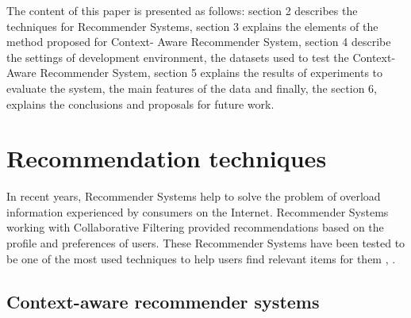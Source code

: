 The content of this paper is presented as
follows: section 2 describes the techniques for Recommender Systems, section 3
explains the elements of the method proposed for Context- Aware Recommender
System, section 4 describe the settings of development environment, the datasets
used to test the Context-Aware Recommender System, section 5 explains the
results of experiments to evaluate the system, the main features of the data and
finally, the section 6, explains the conclusions and proposals for future work.




\section{ Recommendation techniques } \label{sec:2} 

In recent years, Recommender Systems help to solve the problem of overload
information experienced by consumers on the Internet. Recommender Systems
working with Collaborative Filtering provided recommendations based on the
profile and preferences of users. These Recommender Systems have been tested to
be one of the most used techniques to help users find relevant items for them
\cite{dey2001understanding}, \cite{burke2007hybrid}.

  \subsection{Context-aware recommender systems} \label{sec:2.1}  

